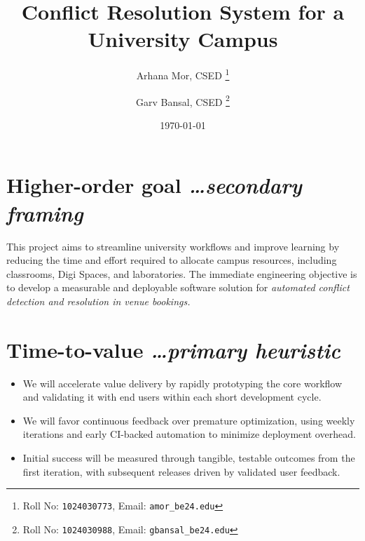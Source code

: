 \documentclass[11pt,a4paper]{article}
\title{Conflict Resolution System for a University Campus}
\author{
  Arhana Mor, CSED%
  \thanks{Roll No: \texttt{1024030773}, %
    Email: \texttt{amor\_be24\@thapar.edu}}
  \and 
  Garv Bansal, CSED%
  \thanks{Roll No: \texttt{1024030988}, %
    Email: \texttt{gbansal\_be24\@thapar.edu}}
}
\date{\today}
\newcommand{\BvrHint}[1]{%
  {\normalfont\normalsize\itshape\hfill #1}}
\begin{document}
\maketitle

\section{Higher-order goal%
  \BvrHint{\ldots secondary framing}}
This project aims to streamline university workflows and improve learning by reducing the time and effort required to allocate campus resources, including classrooms, Digi Spaces, and laboratories. The immediate engineering objective is to develop a measurable and deployable software solution for 
 \emph{automated conflict detection and resolution in venue bookings.} 

\section{Time-to-value %
\BvrHint{\ldots primary heuristic}}
\begin{itemize}[leftmargin=0.7cm]
    \item We will accelerate value delivery by rapidly prototyping the core workflow and validating it with end users within each short development cycle.
    \item We will favor continuous feedback over premature optimization, using weekly iterations and early CI-backed automation to minimize deployment overhead.
    \item Initial success will be measured through tangible, testable outcomes from the first iteration, with subsequent releases driven by validated user feedback.
\end{itemize}
\end{document}
